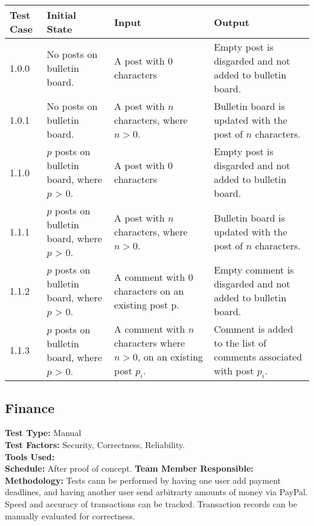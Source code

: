 \documentclass[12pt]{article}
\begin{document}
\begin{longtable}{|p{2cm}|p{3cm}|p{5cm}|p{5cm}|}
  \hline
  \textbf{Test Case} & \textbf{Initial State} & \textbf{Input} & \textbf{Output} \\ \hline
  1.0.0 & No posts on bulletin board. & A post with 0 characters & Empty post is disgarded and not added to bulletin board.\\
  \hline
  1.0.1 & No posts on bulletin board. & A post with $n$ characters, where $n > 0$. & Bulletin board is updated with the post of $n$ characters.\\
  \hline
  1.1.0 & $p$ posts on bulletin board, where $p$ > 0. & A post with 0 characters & Empty post is disgarded and not added to bulletin board.\\
  \hline
  1.1.1 & $p$ posts on bulletin board, where $p$ > 0. & A post with $n$ characters, where $n > 0$. & Bulletin board is updated with the post of $n$ characters.\\
  \hline
  1.1.2 & $p$ posts on bulletin board, where $p$ > 0. & A comment with 0 characters on an existing post p. & Empty comment is disgarded and not added to bulletin board.\\
  \hline
  1.1.3 & $p$ posts on bulletin board, where $p$ > 0. & A comment with $n$ characters where $n > 0$, on an existing post $p_i$. & Comment is added to the list of comments associated with post $p_i$.\\
  \hline
\end{longtable}
  
\subsection{Finance}
\textbf{Test Type:} Manual\\
\textbf{Test Factors:} Security, Correctness, Reliability. \\
\textbf{Tools Used:} \\
\textbf{Schedule:} After proof of concept.
\textbf{Team Member Responsible:} \\
\textbf{Methodology:} Tests cann be performed by having one user add payment deadlines, and having another user send arbitrarty amounts of money via PayPal. Speed and accuracy of transactions can be tracked. Transaction records can be manually evaluated for correctness.
\end{document}
